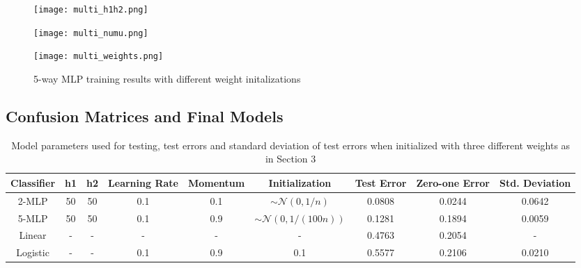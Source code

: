 \documentclass[10pt]{article}
\begin{document}
\begin{figure}[H]
\centering
\begin{minipage}{.48\textwidth}
  \centering
\texttt{[image: multi\_h1h2.png]}
\label{multi_h1h2}
\end{minipage}
\hspace{.03\textwidth}%
\begin{minipage}{.48\textwidth}
  \centering
\texttt{[image: multi\_numu.png]}
\label{multi_numu}
\end{minipage}
\end{figure}

\begin{figure}[H]
\centering
\texttt{[image: multi\_weights.png]}
\caption{5-way MLP training results with different weight initalizations}
\label{multi_weights}
\end{figure}

\subsection{Confusion Matrices and Final Models}

\begin{table}[H]
\def\arraystretch{1.1}
\small
\center
    \begin{tabular}{| c | c | c | c | c | c | c | c | c |}
    \hline
    Classifier & h1 & h2 & Learning Rate & Momentum & Initialization & Test Error & Zero-one Error & Std. Deviation \\ \hline \hline
    2-MLP & 50 & 50 & 0.1 & 0.1 & $\sim \mathcal{N} (0,1/n)$ & 0.0808 & 0.0244 & 0.0642  \\ \hline
    5-MLP & 50 & 50 & 0.1 & 0.9 & $\sim \mathcal{N} (0,1/(100n))$ & 0.1281 & 0.1894 & 0.0059 \\ \hline
    Linear & - & - & - & - & - & 0.4763 & 0.2054 & - \\ \hline
    Logistic & - & - & 0.1 & 0.9 & 0.1 & 0.5577 & 0.2106 & 0.0210 \\ \hline
    \end{tabular}
    \caption{Model parameters used for testing, test errors and standard deviation of test errors when initialized with three different weights as in Section 3}
    \label{test_results}
\end{table}
\end{document}
